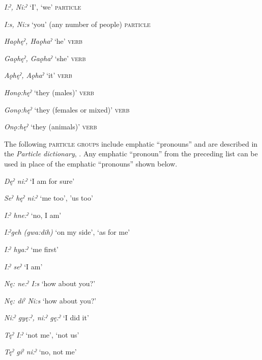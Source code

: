 \begin{CayugaRelated}
\item{} \textit{I:ˀ, Ni:ˀ} ‘I’, ‘we’ \textsc{particle}\\
\item{} \textit{I:s, Ni:s} ‘you’ (any number of people) \textsc{particle}\\
\item{} \textit{Haǫhęˀ, Haǫhaˀ} ‘he’ \textsc{verb}\\
\item{} \textit{Gaǫhęˀ, Gaǫhaˀ} ‘she’ \textsc{verb}\\
\item{} \textit{Aǫhęˀ, Aǫhaˀ} ‘it’ \textsc{verb}\\
\item{} \textit{Honǫ:hęˀ} ‘they (males)’ \textsc{verb}\\
\item{} \textit{Gonǫ:hęˀ} ‘they (females or mixed)’ \textsc{verb}\\
\item{} \textit{Onǫ:hęˀ} ‘they (animals)’ \textsc{verb}\\
\end{CayugaRelated}




The following \textsc{particle groups} include emphatic “pronouns” and are described in the \textit{Particle dictionary}, . Any emphatic “pronoun” from the preceding list can be used in place of the emphatic “pronouns” shown below. 

\begin{CayugaRelated}
    
\item{} \textit{Dęˀ ni:ˀ} ‘I am for sure’\\
\item{} \textit{Seˀ hęˀ ni:ˀ} ‘me too’, 'us too’\\
\item{} \textit{I:ˀ hne:ˀ} ‘no, I am’\\
\item{} \textit{I:ˀgeh (gwa:dih)} ‘on my side’, ‘as for me’\\
\item{} \textit{I:ˀ hya:ˀ} ‘me first’\\
\item{} \textit{I:ˀ seˀ} ‘I am’\\
\item{} \textit{Nę: ne:ˀ I:s} ‘how about you?’\\
\item{} \textit{Nę: diˀ Ni:s} ‘how about you?’\\
\item{} \textit{Ni:ˀ gyę:ˀ, \textit{ni:ˀ} gę:ˀ} ‘I did it’\\
\item{} \textit{Tęˀ I:ˀ} ‘not me’, ‘not us’\\
\item{} \textit{Tęˀ giˀ ni:ˀ} ‘no, not me’\\
\end{CayugaRelated}



